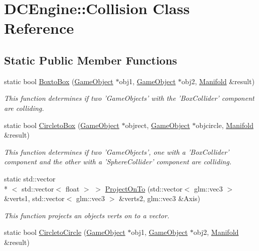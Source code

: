 \hypertarget{classDCEngine_1_1Collision}{\section{D\-C\-Engine\-:\-:Collision Class Reference}
\label{classDCEngine_1_1Collision}
}
\subsection*{Static Public Member Functions}
\begin{DoxyCompactItemize}
\item 
static bool \hyperlink{classDCEngine_1_1Collision_a2e374e9c140f0fd3e48a08c7f692ba57}{Boxto\-Box} (\hyperlink{classDCEngine_1_1GameObject}{Game\-Object} $\ast$obj1, \hyperlink{classDCEngine_1_1GameObject}{Game\-Object} $\ast$obj2, \hyperlink{classDCEngine_1_1Manifold}{Manifold} \&result)
\begin{DoxyCompactList}\small\item\em This function determines if two 'Game\-Objects' with the 'Box\-Collider' component are colliding. \end{DoxyCompactList}\item 
static bool \hyperlink{classDCEngine_1_1Collision_a9fe2558f3a401204c2dfd5379314d4a2}{Circleto\-Box} (\hyperlink{classDCEngine_1_1GameObject}{Game\-Object} $\ast$objrect, \hyperlink{classDCEngine_1_1GameObject}{Game\-Object} $\ast$objcircle, \hyperlink{classDCEngine_1_1Manifold}{Manifold} \&result)
\begin{DoxyCompactList}\small\item\em This function determines if two 'Game\-Objects', one with a 'Box\-Collider' component and the other with a 'Sphere\-Collider' component are colliding. \end{DoxyCompactList}\item 
static std\-::vector\\*
$<$ std\-::vector$<$ float $>$ $>$ \hyperlink{classDCEngine_1_1Collision_ae9e4320d7b1593a637fdbe165d6ab60f}{Project\-On\-To} (std\-::vector$<$ glm\-::vec3 $>$ \&verts1, std\-::vector$<$ glm\-::vec3 $>$ \&verts2, glm\-::vec3 \&Axis)
\begin{DoxyCompactList}\small\item\em This function projects an objects verts on to a vector. \end{DoxyCompactList}\item 
static bool \hyperlink{classDCEngine_1_1Collision_a45759dcb29a1d71b00aa5554809bb681}{Circleto\-Circle} (\hyperlink{classDCEngine_1_1GameObject}{Game\-Object} $\ast$obj1, \hyperlink{classDCEngine_1_1GameObject}{Game\-Object} $\ast$obj2, \hyperlink{classDCEngine_1_1Manifold}{Manifold} \&result)

\end{DoxyCompactItemize}
